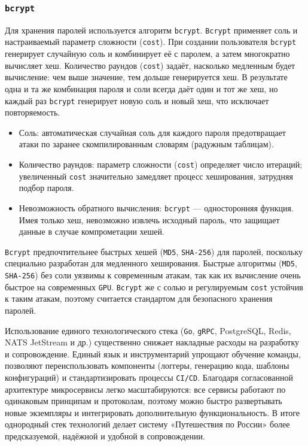 \subsubsection*{\texttt{bcrypt}}
Для хранения паролей используется алгоритм \texttt{bcrypt}. \texttt{Bcrypt} применяет соль и настраиваемый параметр сложности (\texttt{cost}). При создании пользователя \texttt{bcrypt} генерирует случайную соль и комбинирует её с паролем, а затем многократно вычисляет хеш. Количество раундов (\texttt{cost}) задаёт, насколько медленным будет вычисление: чем выше значение, тем дольше генерируется хеш. В результате одна и та же комбинация пароля и соли всегда даёт один и тот же хеш, но каждый раз \texttt{bcrypt} генерирует новую соль и новый хеш, что исключает повторяемость.
\begin{itemize}
    \item Соль: автоматическая случайная соль для каждого пароля предотвращает атаки по заранее скомпилированным словарям (радужным таблицам).
    \item Количество раундов: параметр сложности (\texttt{cost}) определяет число итераций; увеличенный \texttt{cost} значительно замедляет процесс хеширования, затрудняя подбор пароля.
    \item Невозможность обратного вычисления: \texttt{bcrypt} — односторонняя функция. Имея только хеш, невозможно извлечь исходный пароль, что защищает данные в случае компрометации хешей.
\end{itemize}
\texttt{Bcrypt} предпочтительнее быстрых хешей (\texttt{MD5}, \texttt{SHA-256}) для паролей, поскольку специально разработан для медленного хеширования. Быстрые алгоритмы (\texttt{MD5}, \texttt{SHA-256}) без соли уязвимы к современным атакам, так как их вычисление очень быстрое на современных \texttt{GPU}. \texttt{Bcrypt} же с солью и регулируемым \texttt{cost} устойчив к таким атакам, поэтому считается стандартом для безопасного хранения паролей. 

Использование единого технологического стека (\texttt{Go}, \texttt{gRPC}, PostgreSQL, Redis, NATS JetStream и др.) существенно снижает накладные расходы на разработку и сопровождение. Единый язык и инструментарий упрощают обучение команды, позволяют переиспользовать компоненты (логгеры, генерацию кода, шаблоны конфигураций) и стандартизировать процессы \texttt{CI/CD}. Благодаря согласованной архитектуре микросервисы легко масштабируются: все сервисы работают по одинаковым принципам и протоколам, поэтому можно быстро развертывать новые экземпляры и интегрировать дополнительную функциональность. В итоге однородный стек технологий делает систему «Путешествия по России» более предсказуемой, надёжной и удобной в сопровождении.


